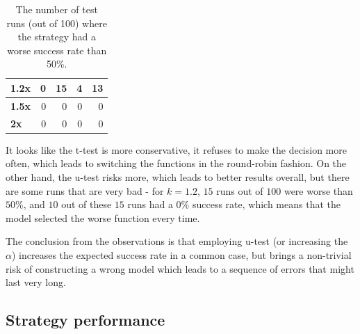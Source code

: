 \begin{table}[h!]
\begin{tabular}{|l|r|r|r|r|}
		\textbf{1.2x}  & 0                                                                                 & 15                                                                                & 4                                                                                 & 13                                                                                \\ \hline
		\textbf{1.5x}  & 0                                                                                 & 0                                                                                 & 0                                                                                 & 0                                                                                 \\ \hline
		\textbf{2x}    & 0                                                                                 & 0                                                                                 & 0                                                                                 & 0                                                                                 \\ \hline
	\end{tabular}
\egroup
\caption{The number of test runs (out of 100) where the strategy had a worse success rate than 50\%.}
\label{tab:strategy_comparison_mean_based_worse_runs}
\end{table}

It looks like the t-test is more conservative, it refuses to make the decision more often, which leads to switching the functions in the round-robin fashion. On the other hand, the u-test risks more, which leads to better results overall, but there are some runs that are very bad - for $k=1.2$, $15$ runs out of $100$ were worse than $50\%$, and $10$ out of these $15$ runs had a $0\%$ success rate, which means that the model selected the worse function every time.

The conclusion from the observations is that employing u-test (or increasing the $\alpha$) increases the expected success rate in a common case, but brings a non-trivial risk of constructing a wrong model which leads to a sequence of errors that might last very long.

\subsection{Strategy performance}
\label{subsec:strategy_perf}

